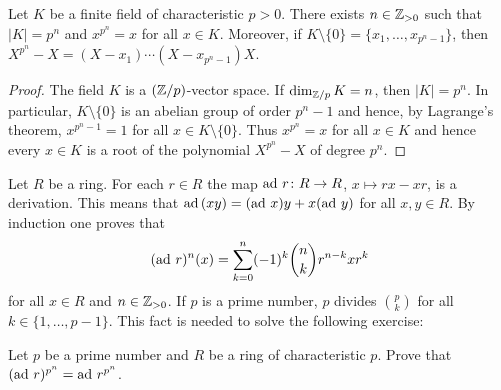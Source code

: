 
\begin{lemma}
	\label{lem:k_finito}
	Let $K$ be a finite field of characteristic $p>0$. There exists 
	$n\in\mathbb{Z}_{>0}$ such that $|K|=p^n$ and $x^{p^n}=x$ for all $x\in K$. Moreover, 
	if $K\setminus\{0\}=\{x_1,\dots,x_{p^n-1}\}$, then 
	$X^{p^n}-X=(X-x_1)\cdots(X-x_{p^n-1})X$. 
\end{lemma}

\begin{proof}
	The field $K$ is a $(\mathbb{Z}/p)$-vector space. If $\dim_{\mathbb{Z}/p} K=n$, then 
	$|K|=p^n$. In particular, $K\setminus\{0\}$ is an abelian
	group of order $p^{n}-1$ and hence, by Lagrange's theorem, 
	$x^{p^n-1}=1$ for all $x\in K\setminus\{0\}$. Thus $x^{p^n}=x$ for all $x\in K$
	and hence every $x\in K$ is a root of the polynomial 
	$X^{p^n}-X$ of degree $p^n$. 
\end{proof}

Let $R$ be a ring. For each $r\in R$ the map $\operatorname{ad}\,r\colon
R\to R$, $x\mapsto rx-xr$, is a derivation. This means that
$\operatorname{ad}\,(xy)=(\operatorname{ad}\,x)y+x(\operatorname{ad}\,y)$ for all $x,y\in R$. 
By induction one proves that 
\begin{equation}
	\label{eq:Leibniz}
	(\operatorname{ad}\,r)^n(x)=\sum_{k=0}^n(-1)^k\binom{n}{k}r^{n-k}xr^k
\end{equation}
for all $x\in R$ and $n\in\mathbb{Z}_{>0}$. If $p$ 
is a prime number, 
$p$ divides $\binom{p}{k}$ for all $k\in\{1,\dots,p-1\}$. This fact
is needed to solve the following exercise:

\begin{exercise}
    Let $p$ be a prime number and $R$ be a ring of characteristic $p$. 
    Prove that $(\operatorname{ad}\,r)^{p^n}=\operatorname{ad}\,r^{p^n}$. 
\end{exercise}



